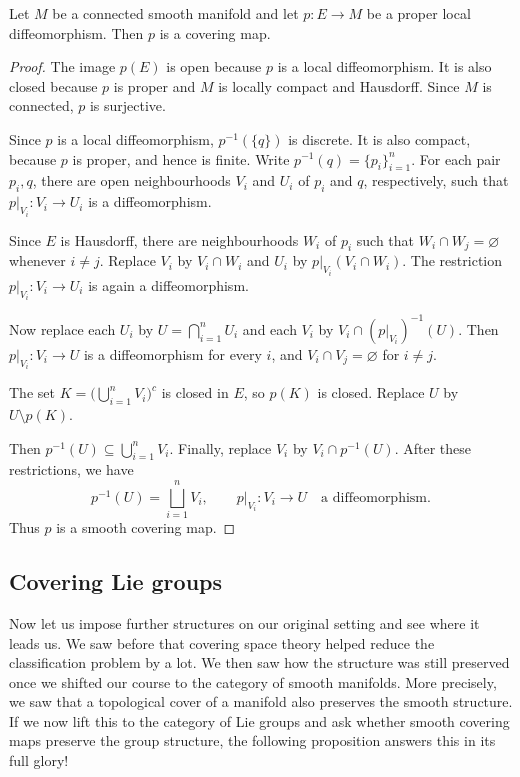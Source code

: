 \documentclass[11pt,a4paper]{article}
\begin{document}
\setcounter{theorem}{2}\begin{proposition}[Answer to Q2]\label{prop:proper-cover}
Let $M$ be a connected smooth manifold and let $p\colon E\to M$ be a proper local diffeomorphism. Then $p$ is a covering map.
\end{proposition}

\begin{proof}
The image $p(E)$ is open because $p$ is a local diffeomorphism. It is also closed because $p$ is proper and $M$ is locally compact and Hausdorff. Since $M$ is connected, $p$ is surjective.

Since $p$ is a local diffeomorphism, $p^{-1}(\{q\})$ is discrete. It is also compact, because $p$ is proper, and hence is finite. Write $p^{-1}(q)=\{p_i\}_{i=1}^{n}$. For each pair $p_i,q$, there are open neighbourhoods $V_i$ and $U_i$ of $p_i$ and $q$, respectively, such that $p|_{V_i}\colon V_i\to U_i$ is a diffeomorphism.

Since $E$ is Hausdorff, there are neighbourhoods $W_i$ of $p_i$ such that $W_i\cap W_j=\varnothing$ whenever $i\ne j$. Replace $V_i$ by $V_i\cap W_i$ and $U_i$ by $p|_{V_i}(V_i\cap W_i)$. The restriction $p|_{V_i}\colon V_i\to U_i$ is again a diffeomorphism.

Now replace each $U_i$ by $U=\bigcap_{i=1}^{n}U_i$ and each $V_i$ by $V_i\cap(p|_{V_i})^{-1}(U)$. Then $p|_{V_i}\colon V_i\to U$ is a diffeomorphism for every $i$, and $V_i\cap V_j=\varnothing$ for $i\ne j$.

The set $K=\bigl(\bigcup_{i=1}^{n}V_i\bigr)^c$ is closed in $E$, so $p(K)$ is closed. Replace $U$ by $U\setminus p(K)$.

Then $p^{-1}(U)\subseteq\bigcup_{i=1}^{n}V_i$. Finally, replace $V_i$ by $V_i\cap p^{-1}(U)$. After these restrictions, we have
\[
p^{-1}(U)=\bigsqcup_{i=1}^{n}V_i,
\qquad p|_{V_i}\colon V_i\longrightarrow U
\quad\text{a diffeomorphism}.
\]
Thus $p$ is a smooth covering map.
\end{proof}

\subsection{Covering Lie groups}

Now let us impose further structures on our original setting and see where it leads us. We saw before that covering space theory helped reduce the classification problem by a lot. We then saw how the structure was still preserved once we shifted our course to the category of smooth manifolds. More precisely, we saw that a topological cover of a manifold also preserves the smooth structure. If we now lift this to the category of Lie groups and ask whether smooth covering maps preserve the group structure, the following proposition answers this in its full glory!
\end{document}
